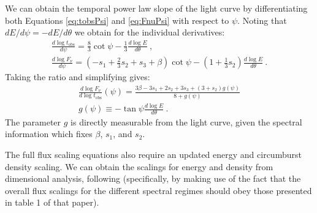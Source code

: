 \documentclass[twocolumn]{aastex62}
\newcommand{\tobs}{\ensuremath{t_{\mathrm{obs}}}}
\begin{document}
	We can obtain the temporal power law slope of the light curve by differentiating both Equations \eqref{eq:tobsPsi} and \eqref{eq:FnuPsi} with respect to $\psi$.  Noting that $dE/d\psi = -dE/d\theta$ we obtain for the individual derivatives:
\begin{eqnarray}
	\frac{d \log \tobs}{d \psi} = \frac{8}{3} \cot \psi - \frac{1}{3} \frac{d \log E}{d \theta}\ , \\
	\frac{d \log F_\nu}{d \psi} = \left(-s_1 + \frac{2}{3} s_2 +s_3+\beta\right)\cot \psi - \left(1+\frac{1}{3}s_2\right) \frac{d \log E}{d \theta}\ .
\end{eqnarray}
Taking the ratio and simplifying gives:
\begin{eqnarray}
	\frac{d \log F_\nu}{d \log \tobs}(\psi) = \frac{3 \beta - 3s_1 + 2s_2+3s_3 + (3+s_2)g(\psi)}{ 8+g(\psi)} \\
	g(\psi) \equiv -\tan \psi \frac{d \log E}{d \theta}\ .
\end{eqnarray}
The parameter $g$ is directly measurable from the light curve, given the spectral information which fixes $\beta$, $s_1$, and $s_2$.

The full flux scaling equations also require an updated energy and circumburst density scaling. We can obtain the scalings for energy and density from dimensional analysis, following \cite{van-Eerten:2012ac} (specifically, by making use of the fact that the overall flux scalings for the different spectral regimes should obey those presented in table 1 of that paper).
\end{document}
